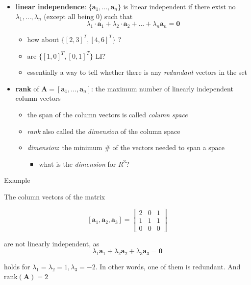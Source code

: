 \documentclass{scrartcl}
\def\tightlist{}
\newcommand{\vv}[1]{\boldsymbol{#1}}
\begin{document}
\begin{frame}{}
\protect\hypertarget{section-3}{}

\begin{itemize}
\item
  \textbf{linear independence}: \(\{\vv{a}_1, \ldots, \vv{a}_n\}\) is
  linear independent if there exist no \(\lambda_1, \ldots, \lambda_n\)
  (except all being 0) such that
  \[\lambda_1\cdot \vv{a}_1 + \lambda_2 \cdot \vv{a}_2+\ldots + \lambda_n\vv{a}_n=\vv{0}\]

  \begin{itemize}
  \tightlist
  \item
    how about \(\{[2,3]^T, [4,6]^T\}\) ?
  \item
    are \(\{[1,0]^T, [0,1]^T\}\) LI?
  \item
    essentially a way to tell whether there is any \emph{redundant}
    vectors in the set
  \end{itemize}
\item
  \textbf{rank} of \(\vv{A} = [\vv{a}_1, \ldots, \vv{a}_n]\): the
  maximum number of linearly independent column vectors

  \begin{itemize}
  \tightlist
  \item
    the span of the column vectors is called \emph{column space}
  \item
    \emph{rank} also called the \emph{dimension} of the column space
  \item
    \emph{dimension}: the minimum \(\#\) of the vectors needed to span a
    space

    \begin{itemize}
    \tightlist
    \item
      what is the \emph{dimension} for \(R^3\)?
    \end{itemize}
  \end{itemize}
\end{itemize}

\end{frame}

\begin{frame}{Example}
\protect\hypertarget{example-2}{}

The column vectors of the matrix

\[[\vv{a}_1, \vv{a}_2, \vv{a}_3]= \begin{bmatrix} 2 &0 & 1 \\
1&1& 1 \\
0 &0&0
\end{bmatrix}\]

are not linearly independent, as
\[\lambda_1 \vv{a}_1 +\lambda_2\vv{a}_2+\lambda_3\vv{a}_3 = \vv{0}\]

holds for \(\lambda_1=\lambda_2=1, \lambda_3=-2\). In other words, one
of them is redundant. And \(\text{rank}(\vv{A}) = 2\)

\end{frame}
\end{document}
